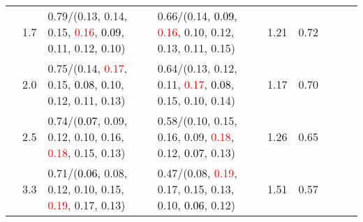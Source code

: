 \documentclass[10pt,a4paper]{report}
\begin{document}
\begin{table}[!htbp]
\begin{center}
{\begin{tabular}{ccllccccc}
				  & 1.7                               & 0.79/(0.13, 0.14, 0.15, \textcolor{red}{0.16}, \textcolor{black}{0.09}, 0.11, 0.12, 0.10)                                                                                                     & 0.66/(0.14, \textcolor{black}{0.09}, \textcolor{red}{0.16}, 0.10, 0.12, 0.13, 0.11, 0.15)                                                                                                     & 1.21             & 0.72                     \\
				  & 2.0                               & 0.75/(0.14, \textcolor{red}{0.17}, 0.15, \textcolor{black}{0.08}, 0.10, 0.12, 0.11, 0.13)                                                                                                     & 0.64/(0.13, 0.12, 0.11, \textcolor{red}{0.17}, \textcolor{black}{0.08}, 0.15, 0.10, 0.14)                                                                                                     & 1.17             & 0.70                     \\
				  & 2.5                               & 0.74/(\textcolor{black}{0.07}, 0.09, 0.12, 0.10, 0.16, \textcolor{red}{0.18}, 0.15, 0.13)                                                                                                     & 0.58/(0.10, 0.15, 0.16, 0.09, \textcolor{red}{0.18}, 0.12, \textcolor{black}{0.07}, 0.13)                                                                                                     & 1.26             & 0.65                     \\
				  & 3.3                               & 0.71/(\textcolor{black}{0.06}, 0.08, 0.12, 0.10, 0.15, \textcolor{red}{0.19}, 0.17, 0.13)                                                                                                     & 0.47/(0.08, \textcolor{red}{0.19}, 0.17, 0.15, 0.13, 0.10, \textcolor{black}{0.06}, 0.12)                                                                                                     & 1.51             & 0.57                     \\
				\bottomrule
			\end{tabular}}
	\end{center}
\end{table}
\end{document}
